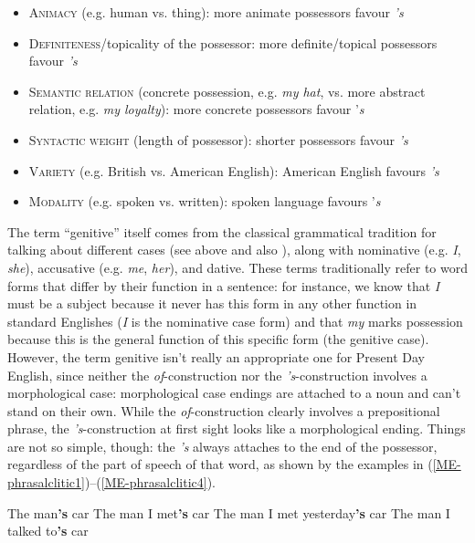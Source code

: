 \begin{itemize}
    \item \textsc{Animacy} (e.g. human vs. thing): more animate possessors favour \emph{'s}
    \item \textsc{Definiteness}/topicality of the possessor: more definite/topical possessors favour \emph{'s}
    \item \textsc{Semantic relation} (concrete possession, e.g. \emph{my hat}, vs. more abstract relation, e.g. \emph{my loyalty}): more concrete possessors favour '\textit{s}
    \item \textsc{Syntactic weight} (length of possessor): shorter possessors favour \emph{'s}
    \item \textsc{Variety} (e.g. British vs. American English): American English favours \emph{'s}
    \item \textsc{Modality} (e.g. spoken vs. written): spoken language favours '\textit{s}
\end{itemize}

\noindent The term ``genitive'' itself comes from the classical grammatical tradition for talking about different cases (see  above and also ), along with nominative (e.g. \textit{I}, \textit{she}), accusative (e.g. \textit{me}, \textit{her}), and dative. These terms traditionally refer to word forms that differ by their function in a sentence: for instance, we know that \textit{I} must be a subject because it never has this form in any other function in standard Englishes (\textit{I} is the nominative case form) and that \textit{my} marks possession because this is the general function of this specific form (the genitive case). However, the term genitive isn't really an appropriate one for Present Day English, since neither the \emph{of}-construction nor the \emph{'s}-construction involves a morphological case: morphological case endings are attached to a noun and can't stand on their own. While the \emph{of}-construction clearly involves a prepositional phrase, the \emph{'s}-construction at first sight looks like a morphological ending. Things are not so simple, though: the \emph{'s} always attaches to the end of the possessor, regardless of the part of speech of that word, as shown by the examples in (\ref{ME-phrasalclitic1})--(\ref{ME-phrasalclitic4}).

\begin{exe}
\ex\label{ME-phrasalclitic1} The man\textbf{'s} car
\ex\label{ME-phrasalclitic2} The man I met\textbf{'s} car
\ex\label{ME-phrasalclitic3} The man I met yesterday\textbf{'s} car
\ex\label{ME-phrasalclitic4} The man I talked to\textbf{'s} car
\end{exe}

